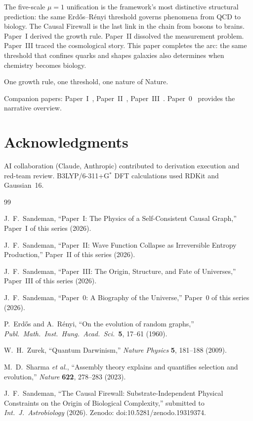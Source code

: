 \documentclass[11pt,a4paper]{article}
\theoremstyle{plain}
\theoremstyle{definition}
\theoremstyle{remark}
\begin{document}
The five-scale $\mu = 1$ unification is the framework's most distinctive structural
prediction: the same Erd\H{o}s--R\'enyi threshold governs phenomena from QCD to
biology.  The Causal Firewall is the last link in the chain from bosons to brains.
Paper~I derived the growth rule.  Paper~II dissolved the measurement problem.
Paper~III traced the cosmological story.  This paper completes the arc: the same
threshold that confines quarks and shapes galaxies also determines when chemistry
becomes biology.

One growth rule, one threshold, one nature of Nature.

Companion papers: Paper~I~\cite{P1}, Paper~II~\cite{P2}, Paper~III~\cite{P3}.
Paper~0~\cite{P0} provides the narrative overview.

\section*{Acknowledgments}

AI collaboration (Claude, Anthropic) contributed to derivation execution and
red-team review.  B3LYP/6-311+G$^*$ DFT calculations used RDKit and Gaussian~16.

\begin{thebibliography}{99}

J.~F.~Sandeman,
``Paper~I: The Physics of a Self-Consistent Causal Graph,''
Paper~I of this series (2026).

J.~F.~Sandeman,
``Paper~II: Wave Function Collapse as Irreversible Entropy Production,''
Paper~II of this series (2026).

J.~F.~Sandeman,
``Paper~III: The Origin, Structure, and Fate of Universes,''
Paper~III of this series (2026).

J.~F.~Sandeman,
``Paper~0: A Biography of the Universe,''
Paper~0 of this series (2026).

P.~Erd\H{o}s and A.~R\'enyi,
``On the evolution of random graphs,''
\textit{Publ.\ Math.\ Inst.\ Hung.\ Acad.\ Sci.}\ \textbf{5}, 17--61 (1960).

W.~H.~Zurek,
``Quantum Darwinism,''
\textit{Nature Physics} \textbf{5}, 181--188 (2009).

M.~D.~Sharma \textit{et al.},
``Assembly theory explains and quantifies selection and evolution,''
\textit{Nature} \textbf{622}, 278--283 (2023).

J.~F.~Sandeman,
``The Causal Firewall: Substrate-Independent Physical Constraints on the
Origin of Biological Complexity,''
submitted to \textit{Int.\ J.\ Astrobiology} (2026).
Zenodo: doi:10.5281/zenodo.19319374.

\end{thebibliography}
\end{document}
